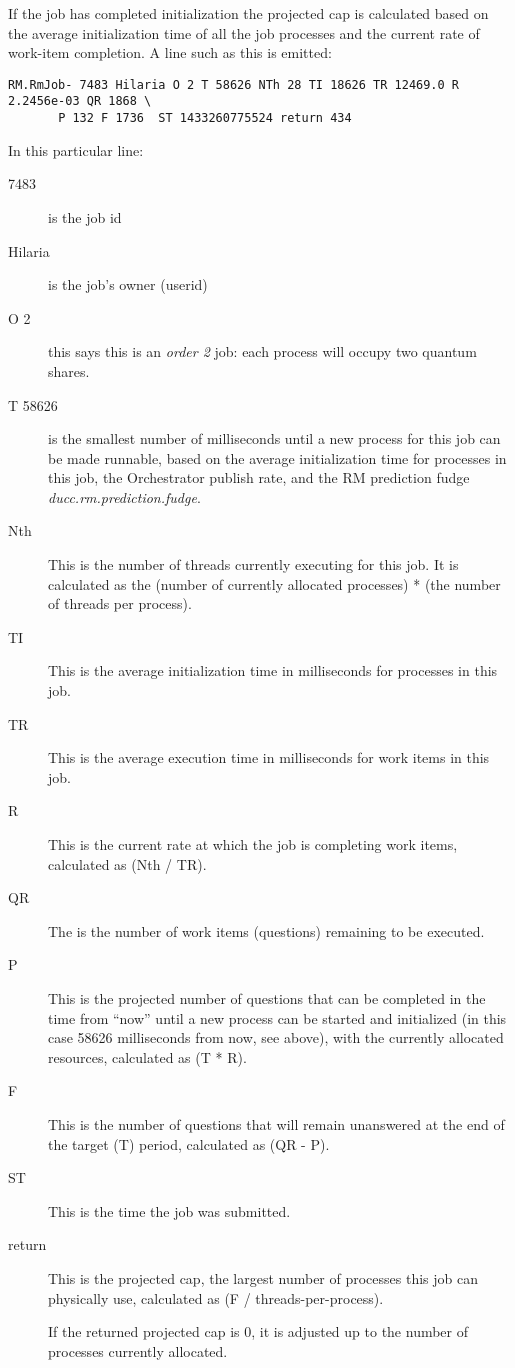    If the job has completed initialization the projected cap is calculated based on 
   the average initialization time of all the job processes and the current rate of
   work-item completion.  A line such as this is emitted:
\begin{verbatim}
RM.RmJob- 7483 Hilaria O 2 T 58626 NTh 28 TI 18626 TR 12469.0 R 2.2456e-03 QR 1868 \
       P 132 F 1736  ST 1433260775524 return 434
\end{verbatim}
   In this particular line:
      \begin{description}
        \item[7483] is the job id
        \item[Hilaria] is the job's owner (userid)
        \item[O 2] this says this is an {\em order 2} job: each process will occupy two quantum shares.
        \item[T 58626] is the smallest number of milliseconds until a new process for this job
          can be made runnable, based on the average initialization time for processes in
          this job, the Orchestrator publish rate, and the RM prediction fudge
          {\em ducc.rm.prediction.fudge}.
        \item[Nth] This is the number of threads currently executing for this job.  It is 
          calculated as the (number of currently allocated processes) * (the number of threads
          per process).
        \item[TI] This is the average initialization time in milliseconds for processes in this job.
        \item[TR] This is the average execution time in milliseconds for work items in this job.
        \item[R] This is the current rate at which the job is completing work items, 
          calculated as (Nth / TR).
        \item[QR] The is the number of work items (questions) remaining to be executed.
        \item[P] This is the projected number of questions that can be completed
          in the time from ``now'' until a new process can be started and initialized
          (in this case 58626 milliseconds from now, see above), with the currently
          allocated resources, calculated as (T * R).
        \item[F] This is the number of questions that will remain unanswered at the
          end of the target (T) period, calculated as (QR - P).
        \item[ST] This is the time the job was submitted.
        \item[return] This is the projected cap, the largest number of processes this
          job can physically use, calculated as (F / threads-per-process).
          
          If the returned projected cap is 0, it is adjusted up to the number of
          processes currently allocated.
      \end{description}
          
